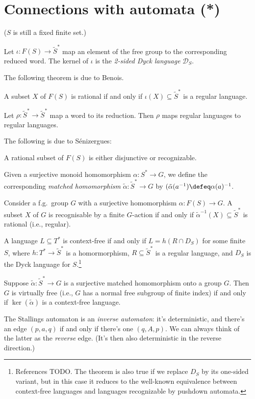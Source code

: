 \section{Connections with automata (*)}

($S$ is still a fixed finite set.)

Let $\iota : F(S) \to \tilde S^*$ map an element of the free group to the corresponding reduced word.
The kernel of $\iota$ is the \emph{2-sided Dyck language} $\mathcal D_S$.

The following theorem is due to Benois.
\begin{theorem}
  A subset $X$ of $F(S)$ is rational if and only if
  $\iota(X)\subseteq \tilde S^*$ is a regular language.
\end{theorem}

\begin{lemma}
  Let $\rho : \tilde S^* \to \tilde S^*$ map a word to its reduction.
  Then $\rho$ maps regular languages to regular languages.
\end{lemma}

The following is due to Sénizergues:
\begin{theorem}
  A rational subset of $F(S)$ is either disjunctive or recognizable.
\end{theorem}

Given a surjective monoid homomorphism $\alpha : S^* \to G$,
we define the corresponding \emph{matched homomorphism} $\tilde\alpha : \tilde S^* \to G$ by $(\tilde\alpha(a^{-1}) \defeq \alpha(a)^{-1}$.
\begin{theorem}[?]
  Consider a f.g.\ group $G$ with a surjective homomorphism
  $\alpha : F(S) \to G$. A subset $X$ of $G$ is recognisable by a finite $G$-action
  if and only if $\tilde\alpha^{-1}(X) \subseteq \tilde S^*$ is rational (i.e., regular).
\end{theorem}
\begin{theorem}
  A language $L \subseteq T^*$ is context-free if and only if
  $L = h(R \cap D_S)$ for some finite $S$,
  where $h : T^* \to \tilde S^*$ is a homormorphism,
  $R \subseteq \tilde S^*$ is a regular language, and
  $D_S$ is the Dyck language for $S$.\footnote{%
    References TODO. The theorem is also true if we replace $D_S$
    by its one-sided variant, but in this case it reduces to
    the well-known equivalence between context-free languages
    and languages recognizable by pushdown automata.}
\end{theorem}
\begin{theorem}
  Suppose $\tilde\alpha : \tilde S^* \to G$ is a surjective matched homomorphism
  onto a group $G$. Then $G$ is virtually free (i.e., $G$ has a normal free subgroup of finite index) if and only if $\ker(\tilde\alpha)$ is a context-free language.
\end{theorem}
\begin{theorem}

\end{theorem}
The Stallings automaton is an \emph{inverse automaton}:
it's deterministic,
and there's an edge $(p,a,q)$ if and only if there's one $(q,A,p)$.
We can always think of the latter as the \emph{reverse} edge.
(It's then also deterministic in the reverse direction.)

